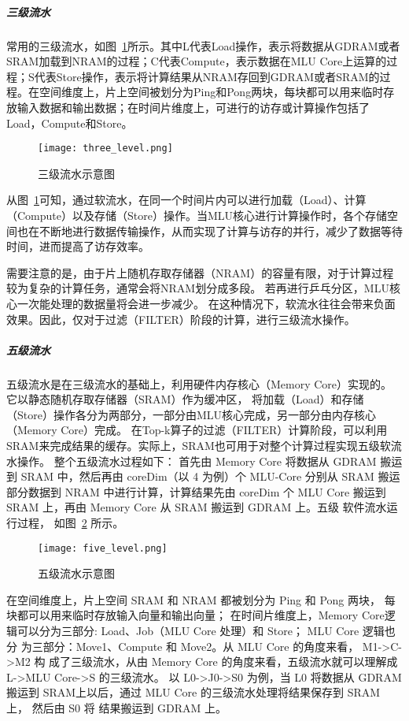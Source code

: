 \subparagraph{三级流水}
常用的三级流水，如图~\ref{fig:three_level}所示。其中L代表Load操作，表示将数据从GDRAM或者SRAM加载到NRAM的过程；C代表Compute，表示数据在MLU Core上运算的过程；S代表Store操作，表示将计算结果从NRAM存回到GDRAM或者SRAM的过程。在空间维度上，片上空间被划分为Ping和Pong两块，每块都可以用来临时存放输入数据和输出数据；在时间片维度上，可进行的访存或计算操作包括了Load，Compute和Store。
\begin{figure}[ht]
    \centering
    \texttt{[image: three\_level.png]}
    \caption{三级流水示意图}
    \label{fig:three_level}
\end{figure}
从图~\ref{fig:three_level}可知，通过软流水，在同一个时间片内可以进行加载（Load）、计算（Compute）以及存储（Store）操作。当MLU核心进行计算操作时，各个存储空间也在不断地进行数据传输操作，从而实现了计算与访存的并行，减少了数据等待时间，进而提高了访存效率。

需要注意的是，由于片上随机存取存储器（NRAM）的容量有限，对于计算过程较为复杂的计算任务，通常会将NRAM划分成多段。
若再进行乒乓分区，MLU核心一次能处理的数据量将会进一步减少。
在这种情况下，软流水往往会带来负面效果。因此，仅对于过滤（FILTER）阶段的计算，进行三级流水操作。


\subparagraph{五级流水}

五级流水是在三级流水的基础上，利用硬件内存核心（Memory Core）实现的。它以静态随机存取存储器（SRAM）作为缓冲区，
将加载（Load）和存储（Store）操作各分为两部分，一部分由MLU核心完成，另一部分由内存核心（Memory Core）完成。
在Top-k算子的过滤（FILTER）计算阶段，可以利用SRAM来完成结果的缓存。实际上，SRAM也可用于对整个计算过程实现五级软流水操作。
整个五级流水过程如下：
首先由 Memory Core 将数据从 GDRAM 搬运到 SRAM 中，然后再由 coreDim（以 4 为例）个 MLU-Core 分别从 
SRAM 搬运部分数据到 NRAM 中进行计算，计算结果先由 coreDim 个 MLU Core 搬运到 SRAM 上，再由 Memory Core 从 
SRAM 搬运到 GDRAM 上。五级 软件流水运行过程，
如图~\ref{fig:five_level} 所示。
\begin{figure}[ht]
    \centering
    \texttt{[image: five\_level.png]}
    \caption{五级流水示意图}
    \label{fig:five_level}
\end{figure}
在空间维度上，片上空间 SRAM 和 NRAM 都被划分为 Ping 和 Pong 两块， 每块都可以用来临时存放输入向量和输出向量；
在时间片维度上，Memory Core逻辑可以分为三部分: Load、Job（MLU Core 处理）和 Store；
MLU Core 逻辑也分 为三部分：Move1、Compute 和 Move2。从 MLU Core 的角度来看，
M1->C->M2 构 成了三级流水，从由 Memory Core 的角度来看，五级流水就可以理解成 L->MLU Core->S 的三级流水。
以 L0->J0->S0 为例，当 L0 将数据从 GDRAM 搬运到 SRAM上以后，通过 MLU Core 的三级流水处理将结果保存到 SRAM 上，
然后由 S0 将 结果搬运到 GDRAM 上。






